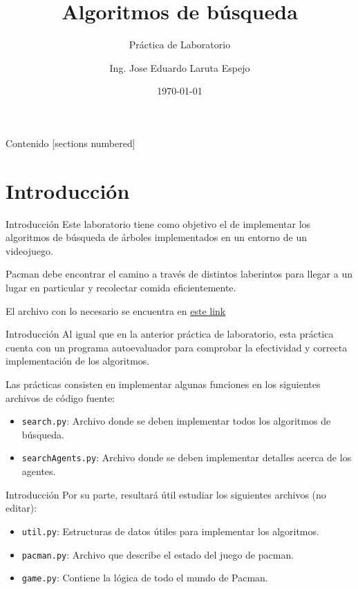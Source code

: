 \documentclass[10pt]{beamer}
\title{Algoritmos de búsqueda}
\subtitle{Práctica de Laboratorio}
\date{\today}
\author{Ing. Jose Eduardo Laruta Espejo}
\institute{Universidad La Salle}
\begin{document}
\maketitle

\begin{frame}[allowframebreaks]{Contenido}
  [sections numbered]
  \tableofcontents[]
\end{frame}


\section{Introducción}
\begin{frame}[fragile]{Introducción}
Este laboratorio tiene como objetivo el de implementar los algoritmos de búsqueda de árboles 
implementados en un entorno de un videojuego.

Pacman debe encontrar el camino a través de distintos laberintos para llegar a un lugar en 
particular y recolectar comida eficientemente.

El archivo con lo necesario se encuentra en \href{https://inst.eecs.berkeley.edu/~cs188/fa18/assets/files/tutorial.zip}{este link}
\end{frame}

\begin{frame}{Introducción}
Al igual que en la anterior práctica de laboratorio, esta práctica cuenta con un programa autoevaluador
para comprobar la efectividad y correcta implementación de los algoritmos.

Las prácticas consisten en implementar algunas funciones en los siguientes archivos de código fuente:
\begin{itemize}
    \item \texttt{search.py}: Archivo donde se deben implementar todos los algoritmos de búsqueda.
    \item \texttt{searchAgents.py}: Archivo donde se deben implementar detalles acerca de los agentes.
\end{itemize}
\end{frame}


\begin{frame}{Introducción}
Por su parte, resultará útil estudiar los siguientes archivos (no editar):
\begin{itemize}
    \item \texttt{util.py}: Estructuras de datos útiles para implementar los algoritmos.
    \item \texttt{pacman.py}: Archivo que describe el estado del juego de pacman.
    \item \texttt{game.py}: Contiene la lógica de todo el mundo de Pacman.
\end{itemize}
\end{frame}
\end{document}
